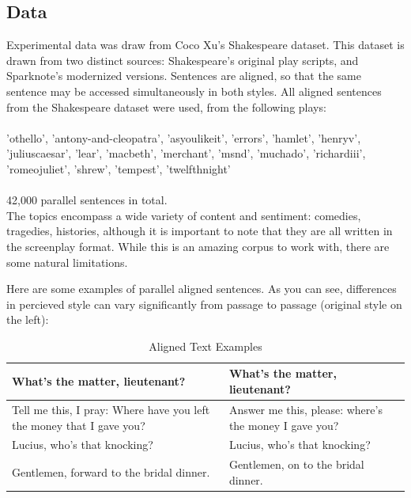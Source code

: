 \documentclass[letterpaper, 10 pt, conference]{ieeeconf}  %
\begin{document}
  \subsection{Data}
  Experimental data was draw from Coco Xu's Shakespeare dataset. This dataset is drawn from two distinct sources: Shakespeare's original play scripts, and Sparknote's modernized versions. Sentences are aligned, so that the same sentence may be accessed simultaneously in both styles.
  All aligned sentences from the Shakespeare dataset were used, from the following plays:\\ \\ 'othello', 'antony-and-cleopatra', 'asyoulikeit', 
                       'errors', 'hamlet', 'henryv', 'juliuscaesar', 'lear', 'macbeth', 
                       'merchant', 'msnd', 'muchado', 'richardiii', 'romeojuliet', 
                       'shrew', 'tempest', 'twelfthnight'
\\ \\
  42,000 parallel sentences in total.
\\
  The topics encompass a wide variety of content and sentiment: comedies, tragedies, histories, although it is important to note that they are all written in the screenplay format. While this is an amazing corpus to work with, there are some natural limitations.

  Here are some examples of parallel aligned sentences. As you can see, differences in percieved style can vary significantly from passage to passage (original style on the left):


  \begin{table}[h]
    \caption{Aligned Text Examples}
    \label{table_example}
    \begin{center}
      \begin{tabular}{| p{3.5cm}  | p{3.5cm} |}
      \hline
      What's the matter, lieutenant? & What's the matter, lieutenant?\\
      \hline
      Tell me this, I pray: Where have you left the money that I gave you? & Answer me this, please: where's the money I gave you?\\
      \hline
      Lucius, who's that knocking? & Lucius, who's that knocking?\\
      \hline
      Gentlemen, forward to the bridal dinner. & Gentlemen, on to the bridal dinner.\\
      \hline
      \end{tabular}
    \end{center}
  \end{table}
\end{document}
